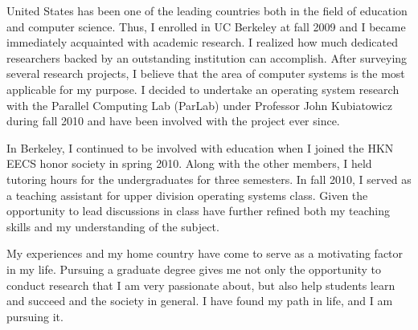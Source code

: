 \documentclass[12pt]{article}
\begin{document}
United States has been one of the leading countries both in the field of education and computer science. Thus, I enrolled in UC Berkeley at fall 2009 and I became immediately acquainted with academic research. I realized how much dedicated researchers backed by an outstanding institution can accomplish. After surveying several research projects, I believe that the area of computer systems is the most applicable for my purpose. I decided to undertake an operating system research with the Parallel Computing Lab (ParLab) under Professor John Kubiatowicz during fall 2010 and have been involved with the project ever since. \newline

In Berkeley, I continued to be involved with education when I joined the HKN EECS honor society in spring 2010. Along with the other members, I held tutoring hours for the undergraduates for three semesters. In fall 2010, I served as a teaching assistant for upper division operating systems class. Given the opportunity to lead discussions in class have further refined both my teaching skills and my understanding of the subject. \newline

My experiences and my home country have come to serve as a motivating factor in my life. Pursuing a graduate degree gives me not only the opportunity to conduct research that I am very passionate about, but also help students learn and succeed and the society in general. I have found my path in life, and I am pursuing it. \newline
\end{document}
